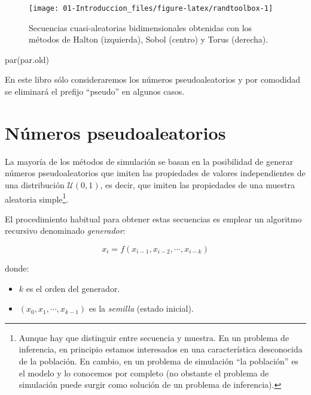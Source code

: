 \documentclass[
]{book}
\newenvironment{Shaded}{\begin{snugshade}}{\end{snugshade}}
\newcommand{\FunctionTok}[1]{\textcolor[rgb]{0.00,0.00,0.00}{#1}}
\newcommand{\NormalTok}[1]{#1}
\theoremstyle{break}
\theoremstyle{definition}
\theoremstyle{definition}
\theoremstyle{definition}
\theoremstyle{definition}
\theoremstyle{remark}
\begin{document}
\begin{figure}[!htb]

{\centering \texttt{[image: 01-Introduccion\_files/figure-latex/randtoolbox-1]} 

}

\caption{Secuencias cuasi-aleatorias bidimensionales obtenidas con los métodos de Halton (izquierda), Sobol (centro) y Torus (derecha).}\label{fig:randtoolbox}
\end{figure}

\begin{Shaded}
\begin{Highlighting}[]
\FunctionTok{par}\NormalTok{(par.old)}
\end{Highlighting}
\end{Shaded}

En este libro sólo consideraremos los números pseudoaleatorios y por comodidad se eliminará el prefijo ``pseudo'' en algunos casos.

\hypertarget{nuxfameros-pseudoaleatorios}{%
\section{Números pseudoaleatorios}\label{nuxfameros-pseudoaleatorios}}

La mayoría de los métodos de simulación se basan en la posibilidad de generar números pseudoaleatorios que imiten las propiedades de valores independientes de una distribución \(\mathcal{U}(0,1)\), es decir, que imiten las propiedades de una muestra aleatoria simple\footnote{Aunque hay que distinguir entre secuencia y muestra. En un problema de inferencia, en principio estamos interesados en una característica desconocida de la población. En cambio, en un problema de simulación ``la población'' es el modelo y lo conocemos por completo (no obstante el problema de simulación puede surgir como solución de un problema de inferencia).}.

El procedimiento habitual para obtener estas secuencias es emplear un algoritmo recursivo denominado \emph{generador}:

\[x_{i} = f\left( x_{i-1}, x_{i-2}, \cdots, x_{i-k}\right)\]

donde:

\begin{itemize}
\item
  \(k\) es el orden del generador.
\item
  \(\left( x_{0},x_{1},\cdots,x_{k-1}\right)\) es la \emph{semilla}
  (estado inicial).
\end{itemize}
\end{document}
